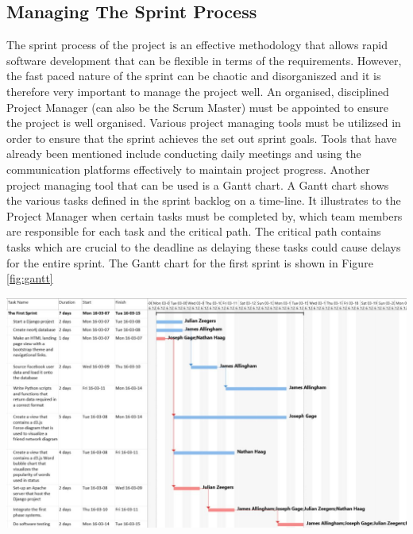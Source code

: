 \documentclass[12pt,onecolumn]{article}
\begin{document}
	\subsection{Managing The Sprint Process}
	The sprint process of the project is an effective methodology that allows rapid software development that can be flexible in terms of the requirements. However, the fast paced nature of the sprint can be chaotic and disorganiszed and it is therefore very important to manage the project well. An organised, disciplined Project Manager (can also be the Scrum Master) must be appointed to ensure the project is well organised. Various project managing tools must be utilizsed in order to ensure that the sprint achieves the set out sprint goals. Tools that have already been mentioned include conducting daily meetings and using the communication platforms effectively to maintain project progress. Another project managing tool that can be used is a Gantt chart. A Gantt chart shows the various tasks defined in the sprint backlog on a time-line. It illustrates to the Project Manager when certain tasks must be completed by, which team members are responsible for each task and the critical path. The critical path contains tasks which are crucial to the deadline as delaying these tasks could cause delays for the entire sprint. The Gantt chart for the first sprint is shown in Figure \ref{fig:gantt}
	
	\begin{center}
		\includegraphics[width=\textwidth]{gantt}
		 \label{fig:gantt}
	\end{center}
	
\end{document}
